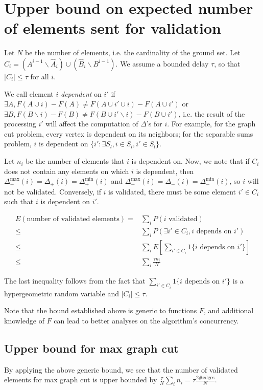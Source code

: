 \section{Upper bound on expected number of elements sent for validation}
\label{app:proofocc}
Let $N$ be the number of elements, i.e. the cardinality of the ground set.
Let $C_i = (A^{i-1} \backslash \hat{A}_i) \cup (\hat{B}_i \backslash B^{i-1})$.
We assume a bounded delay $\tau$, so that $|C_i| \leq \tau$ for all $i$.

We call element $i$ \textit{dependent} on $i'$ if $\exists A, F(A\cup i)-F(A) \neq F(A\cup i' \cup i)-F(A\cup i')$ or $\exists B, F(B\backslash i)-F(B) \neq F(B\cup i'\backslash i) - F(B\cup i')$, i.e. the result of the processing $i'$ will affect the computation of $\Delta$'s for $i$.
For example, for the graph cut problem, every vertex is dependent on its neighbors; for the separable sums problem, $i$ is dependent on $\{i': \exists S_l, i\in S_l, i'\in S_l\}$.

Let $n_i$ be the number of elements that $i$ is dependent on.
Now, we note that if $C_i$ does not contain any elements on which $i$ is dependent, then $\Delta_{+}^\text{max}(i) = \Delta_{+}(i) = \Delta_{+}^\text{min}(i)$ and $\Delta_{-}^\text{max}(i) = \Delta_{-}(i) = \Delta_{-}^\text{min}(i)$, so $i$ will not be validated.
Conversely, if $i$ is validated, there must be some element $i'\in C_i$ such that $i$ is dependent on $i'$.

\begin{align*}
E(\text{number of validated elements})
=& \sum_i P(i \text{ validated})\\
\leq& \sum_i P(\exists i'\in C_i, i \text{ depends on } i')\\
\leq& \sum_i E\left[\sum_{i'\in C_i} 1\{i \text{ depends on } i'\}\right]\\
\leq& \sum_i \frac{\tau n_i}{N}
\end{align*}

The last inequality follows from the fact that $\sum_{i'\in C_i} 1\{i \text{ depends on } i'\}$ is a hypergeometric random variable and $|C_i| \leq \tau$.

Note that the bound established above is generic to functions $F$, and additional knowledge of $F$ can lead to better analyses on the algorithm's concurrency.



\subsection{Upper bound for max graph cut}
By applying the above generic bound, we see that the number of validated elements for max graph cut is upper bounded by $\frac{\tau}{N}\sum_i n_i = \tau \frac{2\#\text{edges}}{N}$.


